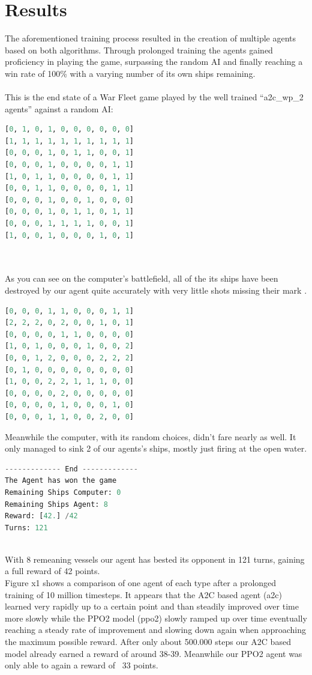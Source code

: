 \documentclass[sigconf]{acmart}
\begin{document}
\section{Results}
The aforementioned training process resulted in the creation of multiple agents based on both algorithms. Through prolonged training the agents gained proficiency in playing the game, surpassing the random AI and finally reaching a win rate of 100\% with a varying number of its own ships remaining.
 \\
 \\
This is the end state of a War Fleet game played by the well trained ``a2c\_wp\_2 agents'' against a random AI:

\begin{lstlisting}[language=Python, caption=Computer battlefield end-state]
[0, 1, 0, 1, 0, 0, 0, 0, 0, 0]
[1, 1, 1, 1, 1, 1, 1, 1, 1, 1]
[0, 0, 0, 1, 0, 1, 1, 0, 0, 1]
[0, 0, 0, 1, 0, 0, 0, 0, 1, 1]
[1, 0, 1, 1, 0, 0, 0, 0, 1, 1] 
[0, 0, 1, 1, 0, 0, 0, 0, 1, 1] 
[0, 0, 0, 1, 0, 0, 1, 0, 0, 0] 
[0, 0, 0, 1, 0, 1, 1, 0, 1, 1] 
[0, 0, 0, 1, 1, 1, 1, 0, 0, 1] 
[1, 0, 0, 1, 0, 0, 0, 1, 0, 1] 
\end{lstlisting}
\\
\\
As you can see on the computer's battlefield, all of the its ships have been destroyed by our agent quite accurately with very little shots missing their mark .
\begin{lstlisting}[language=Python, caption=Agent battlefield end-state]
[0, 0, 0, 1, 1, 0, 0, 0, 1, 1]
[2, 2, 2, 0, 2, 0, 0, 1, 0, 1]
[0, 0, 0, 0, 1, 1, 0, 0, 0, 0] 
[1, 0, 1, 0, 0, 0, 1, 0, 0, 2]
[0, 0, 1, 2, 0, 0, 0, 2, 2, 2]
[0, 1, 0, 0, 0, 0, 0, 0, 0, 0]
[1, 0, 0, 2, 2, 1, 1, 1, 0, 0]
[0, 0, 0, 0, 2, 0, 0, 0, 0, 0]
[0, 0, 0, 0, 1, 0, 0, 0, 1, 0]
[0, 0, 0, 1, 1, 0, 0, 2, 0, 0]
\end{lstlisting}
Meanwhile the computer, with its random choices, didn't fare nearly as well. It only managed to sink 2 of our agents's ships, mostly just firing at the open water.
\\
\vfill
\begin{lstlisting}[language=Python, caption=Game information]
------------- End -------------
The Agent has won the game
Remaining Ships Computer: 0
Remaining Ships Agent: 8
Reward: [42.] /42
Turns: 121
\end{lstlisting}
\\
With 8 remeaning vessels our agent has bested its opponent in 121 turns, gaining a full reward of 42 points.
\\
Figure x1 shows a comparison of one agent of each type after a prolonged training of 10 million timesteps. It appears that the A2C based agent (a2c) learned very rapidly up to a certain point and than steadily improved over time more slowly while the PPO2 model (ppo2) slowly ramped up over time eventually reaching a steady rate of improvement and slowing down again when approaching the maximum possible reward. After only about 500.000 steps our A2C based model already earned a reward of around 38-39. Meanwhile our PPO2 agent was only able to again a reward of ~33 points.
\end{document}
